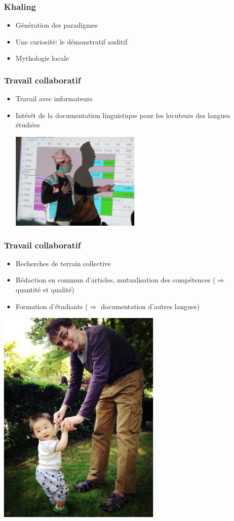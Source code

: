 \documentclass[xcolor=table]{beamer}
\begin{document}
\begin{frame} 
\frametitle{Khaling}
\begin{itemize}[<+->]
\item Génération des paradigmes 
\item Une curiosité: le démonstratif auditif
\item Mythologie locale 
\end{itemize}

\end{frame} 

\begin{frame} 
\frametitle{Travail collaboratif}
\begin{itemize}[<+->]
\item Travail avec informateurs
\item Intérêt de la documentation linguistique pour les locuteurs des langues étudiées

\includegraphics[width=0.5\textwidth]{hdr-image1.jpg}\centering
\end{itemize}

\end{frame} 

\begin{frame} 
\frametitle{Travail collaboratif}

\begin{itemize}[<+->]
\item Recherches de terrain collective
\item Rédaction en commun d'articles, mutualisation des compétences ($\Rightarrow$ quantité et qualité)
\item Formation d'étudiants ($\Rightarrow$ documentation d'autres langues)
\end{itemize}

\end{frame} 

\begin{frame}

\includegraphics[width=0.6\textwidth]{archi.JPG} \centering
\end{frame}   
\end{document}
